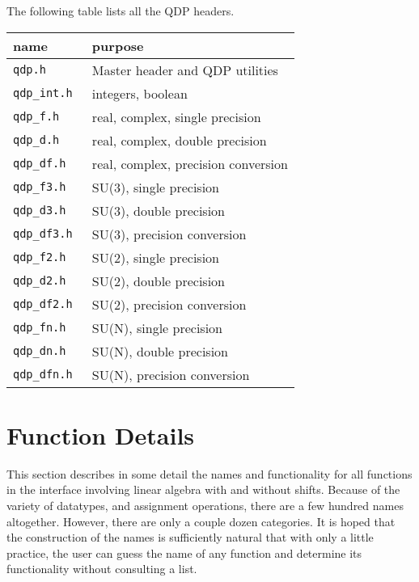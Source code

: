 \documentclass{article}
\newcommand{\ttdash}{{\tt \_}}
\begin{document}
The following table lists all the QDP headers.
\begin{center}
\begin{tabular}{|l|l|}
\hline
 name & purpose \\
\hline
 {\tt qdp.h                   } & Master header and QDP utilities     \\
 {\tt qdp}\ttdash{\tt int.h   } & integers, boolean                   \\
 {\tt qdp}\ttdash{\tt f.h     } & real, complex, single precision     \\
 {\tt qdp}\ttdash{\tt d.h     } & real, complex, double precision     \\
 {\tt qdp}\ttdash{\tt df.h    } & real, complex, precision conversion \\
 {\tt qdp}\ttdash{\tt f3.h    } & SU(3), single precision             \\
 {\tt qdp}\ttdash{\tt d3.h    } & SU(3), double precision             \\
 {\tt qdp}\ttdash{\tt df3.h   } & SU(3), precision conversion         \\
 {\tt qdp}\ttdash{\tt f2.h    } & SU(2), single precision             \\
 {\tt qdp}\ttdash{\tt d2.h    } & SU(2), double precision             \\
 {\tt qdp}\ttdash{\tt df2.h   } & SU(2), precision conversion         \\
 {\tt qdp}\ttdash{\tt fn.h    } & SU(N), single precision             \\
 {\tt qdp}\ttdash{\tt dn.h    } & SU(N), double precision             \\
 {\tt qdp}\ttdash{\tt dfn.h   } & SU(N), precision conversion         \\
\hline
\end{tabular}
\end{center}

\section{Function Details}
\label{sec:details}

This section describes in some detail the names and functionality for
all functions in the interface involving linear algebra with and
without shifts.  Because of the variety of datatypes, and assignment
operations, there are a few hundred names altogether.  However, there
are only a couple dozen categories.  It is hoped that the construction
of the names is sufficiently natural that with only a little practice,
the user can guess the name of any function and determine its
functionality without consulting a list.
\end{document}

